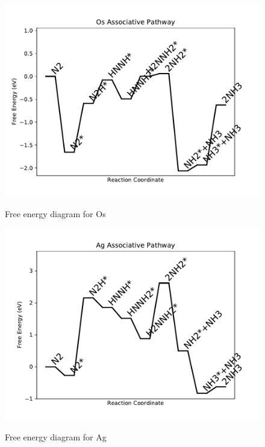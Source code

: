 \documentclass[journal=jacsat,manuscript=article]{achemso}
\begin{document}
\begin{figure}
\includegraphics[width=1\linewidth]{data/plots/Os_associative.pdf}
\label{fig:Os_associative}
\caption{Free energy diagram for Os}
\end{figure}

\newpage
\begin{figure}
\includegraphics[width=1\linewidth]{data/plots/Ag_associative.pdf}
\label{fig:Ag_associative}
\caption{Free energy diagram for Ag}
\end{figure}
\end{document}
